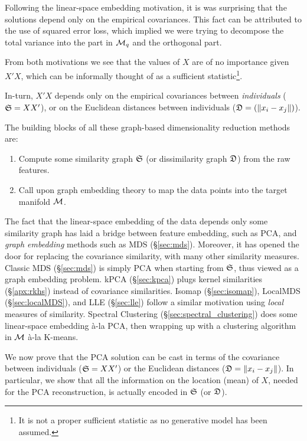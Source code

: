 Following the linear-space embedding motivation, it is was surprising that the solutions depend only on the empirical covariances. This fact can be attributed to the use of squared error loss, which implied we were trying to decompose the total variance into the part in $\mathcal{M}_q$ and the orthogonal part.

From both motivations we see that the values of $X$ are of no importance given $X'X$, which can be informally thought of as a sufficient statistic\footnote{It is not a proper sufficient statistic as no generative model has been assumed.}.  

In-turn, $X'X$ depends only on the empirical covariances between \emph{individuals} ($\mathfrak{S}=XX'$), or on the Euclidean distances between individuals ($\mathfrak{D}=(\Vert x_i-x_j \Vert)$).

The building blocks of all these graph-based dimensionality reduction methods are:
\begin{enumerate}
\item Compute some similarity graph $\mathfrak{S}$ (or dissimilarity graph $\mathfrak{D}$) from the raw features.
\item Call upon graph embedding theory to map the data points into the target manifold $\mathcal{M}$.
\end{enumerate}
The fact that the linear-space embedding of the data depends only some similarity graph has laid a bridge between feature embedding, such as PCA, and \emph{graph embedding} methods such as MDS (\S\ref{sec:mds}).
Moreover, it has opened the door for replacing the covariance similarity, with many other similarity measures. 
Classic MDS (\S\ref{sec:mds}) is simply PCA when starting from $\mathfrak{S}$, thus viewed as a graph embedding problem.
kPCA (\S\ref{sec:kpca}) plugs kernel similarities (\S\ref{apx:rkhs}) instead of covariance similarities. 
Isomap (\S\ref{sec:isomap}), LocalMDS (\S\ref{sec:localMDS}), and LLE (\S\ref{sec:lle}) follow a similar motivation using \emph{local} measures of similarity.
Spectral Clustering (\S\ref{sec:spectral_clustering}) does some linear-space embedding \`a-la PCA, then wrapping up with a clustering algorithm in $\mathcal{M}$ \`a-la K-means. 



We now prove that the PCA solution can be cast in terms of the covariance between individuals ($\mathfrak{S}=XX'$) or the Euclidean distances ($\mathfrak{D}=\Vert x_i-x_j \Vert$).
In particular, we show that all the information on the location (mean) of $X$, needed for the PCA reconstruction, is actually encoded in $\mathfrak{S}$ (or $\mathfrak{D}$).

